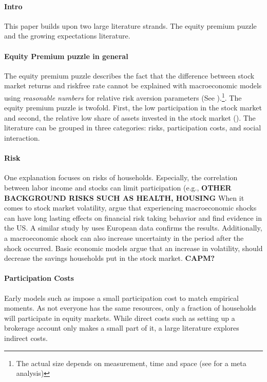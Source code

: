 \documentclass[ProjectABM]{subfiles}
\begin{document}
\paragraph{Intro}
This paper builds upon two large literature strands. The equity premium puzzle and the growing expectations literature.

\paragraph{Equity Premium puzzle in general}
The equity premium puzzle describes the fact that the difference between stock market returns and riskfree rate cannot be explained with macroeconomic models using \textit{reasonable numbers} for relative risk aversion parameters (See \cite{mehra_porescott_1985equity_premium, haliassos_bertraut_1995equity_premium, Gomes_et_al_2021}).\footnote{ The actual size depends on measurement, time and space (see\cite{vanEwijk_et_al_2012meta_equity_premium} for a meta analysis)}. The equity premium puzzle is twofold. First, the low participation in the stock market and second, the relative low share of assets invested in the stock market (\cite{campbell_2006household_finance}). 
The literature can be grouped in three categories: risks, participation costs, and social interaction.

\paragraph{Risk}
One explanation focuses on risks of households. Especially, the correlation between labor income and stocks can limit participation (e.g.,\cite{BCG2007stocklabor} \textbf{OTHER BACKGROUND RISKS SUCH AS HEALTH, HOUSING}
When it comes to stock market volatility, \cite{malmendier_2011} argue that experiencing macroeconomic shocks can have long lasting effects on financial risk taking behavior and find evidence in the US. A similar study by \cite{ampudia_ehrmann_2017macroeconomic} uses European data confirms the results. 
Additionally, a macroeconomic shock can also increase uncertainty in the period after the shock occurred. Basic economic models argue that an increase in volatility, should decrease the savings households put in the stock market. \textbf{CAPM?}

\paragraph{Participation Costs}
Early models such as \cite{vissing_2003, HM2003portfolio, GM2005portfolio} impose a small participation cost to match empirical moments. As not everyone has the same resources, only a fraction of households will participate in equity markets. While direct costs such as setting up a brokerage account only makes a small part of it, a large literature explores indirect costs.
\end{document}
